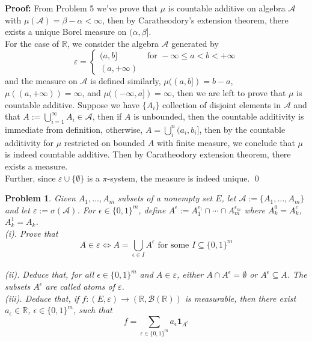 \documentclass[12pt]{article}
\newtheorem{problem}{Problem}
\begin{document}
\textbf{Proof:} From Problem 5 we've prove that $\mu$ is countable additive on algebra $\mathcal{A}$ with $\mu(\mathcal{A})=\beta-\alpha<\infty$, then by Caratheodory's extension theorem, there exists a unique Borel measure on $(\alpha,\beta]$. \\
\indent For the case of $\mathbb{R}$, we consider the algebra $\mathcal{A}$ generated by 
$$
    \varepsilon=\begin{cases}
  (a,b] & \text{ for } -\infty\leq a<b<+\infty \\
  (a,+\infty) & 
\end{cases}
$$
and the measure on $\mathcal{A}$ is defined similarly, $\mu((a,b])=b-a$, $\mu((a, +\infty))=\infty$, and $\mu((-\infty, a])=\infty$, then we are left to prove that $\mu$ is countable additive. Suppose we have $\{A_i\}$ collection of disjoint elements in $\mathcal{A}$ and that $A:=\bigcup_{i=1}^{\infty}A_i\in\mathcal{A}$, then if $A$ is unbounded, then the countable additivity is immediate from definition, otherwise, $A=\bigcup_{i}^n(a_i,b_i]$, then by the countable additivity for $\mu$ restricted on bounded $A$ with finite measure, we conclude that $\mu$ is indeed countable additive. Then by Caratheodory extension theorem, there exists a measure. \\
\indent Further, since $\varepsilon\cup\{\emptyset\}$ is a $\pi$-system, the measure is indeed unique. \qed
\\   
\begin{problem}
    Given $A_1, \dots, A_m$ subsets of a nonempty set $E$, let $\mathcal{A}:=\{A_1, \dots, A_m\}$ and let $\varepsilon:=\sigma(\mathcal{A})$. For $\epsilon\in\{0,1\}^m$, define $A^\epsilon:= A_1^{\epsilon_1}\cap\cdots\cap A_m^{\epsilon_m}$ where $A_k^0=A_k^c$, $A_k^1=A_k$. \\
    \indent (i). Prove that 
    $$
        A\in\varepsilon\iff A=\bigcup_{\epsilon\in I}A^\epsilon \text{ for some } I\subseteq\{0,1\}^m
    $$ \\
    \indent(ii). Deduce that, for all $\epsilon\in\{0,1\}^m$ and $A\in\varepsilon$, either $A\cap A^\epsilon=\emptyset$ or $A^\epsilon\subseteq A$. The subsets $A^\epsilon$ are called atoms of $\varepsilon$. \\
    \indent (iii). Deduce that, if $f:(E,\varepsilon)\to(\mathbb{R}, \mathcal{B}(\mathbb{R}))$ is measurable, then there exist $a_\epsilon\in\mathbb{R}$, $\epsilon\in\{0,1\}^m$, such that 
    $$
        f=\sum\limits_{\epsilon\in\{0,1\}^m}a_\epsilon\textbf{1}_{A^\epsilon}
    $$
\end{problem}
\end{document}
